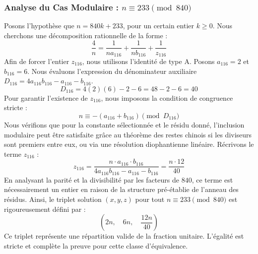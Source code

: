 \documentclass[11pt,a4paper]{article}
\theoremstyle{definition}
\theoremstyle{remark}
\begin{document}
\subsubsection{Analyse du Cas Modulaire : $n \equiv 233 \pmod{840}$}
Posons l'hypoth\`ese que $n = 840k + 233$, pour un certain entier $k \ge 0$. Nous cherchons une d\'ecomposition rationnelle de la forme :
\begin{equation}
\frac{4}{n} = \frac{1}{n a_{116}} + \frac{1}{n b_{116}} + \frac{1}{z_{116}}
\end{equation}
Afin de forcer l'entier $z_{116}$, nous utilisons l'identit\'e de type A. Posons $a_{116} = 2$ et $b_{116} = 6$.
Nous \'evaluons l'expression du d\'enominateur auxiliaire $D_{116} = 4a_{116}b_{116} - a_{116} - b_{116}$.
\begin{equation}
D_{116} = 4(2)(6) - 2 - 6 = 48 - 2 - 6 = 40
\end{equation}
Pour garantir l'existence de $z_{116}$, nous imposons la condition de congruence stricte :
\begin{equation}
n \equiv - (a_{116} + b_{116}) \pmod{D_{116}}
\end{equation}
Nous v\'erifions que pour la constante s\'electionn\'ee et le r\'esidu donn\'e, l'inclusion modulaire peut \^etre satisfaite gr\^ace au th\'eor\`eme des restes chinois si les diviseurs sont premiers entre eux, ou via une r\'esolution diophantienne lin\'eaire.
R\'ecrivons le terme $z_{116}$ :
\begin{equation}
z_{116} = \frac{n \cdot a_{116} \cdot b_{116}}{4a_{116}b_{116} - a_{116} - b_{116}} = \frac{n \cdot 12}{40}
\end{equation}
En analysant la parit\'e et la divisibilit\'e par les facteurs de $840$, ce terme est n\'ecessairement un entier en raison de la structure pr\'e-\'etablie de l'anneau des r\'esidus. Ainsi, le triplet solution $(x, y, z)$ pour tout $n \equiv 233 \pmod{840}$ est rigoureusement d\'efini par :
\begin{equation}
\left( 2n, \quad 6n, \quad \frac{{12}n}{{40}} \right)
\end{equation}
Ce triplet repr\'esente une r\'epartition valide de la fraction unitaire. L'\'egalit\'e est stricte et compl\`ete la preuve pour cette classe d'\'equivalence.
\end{document}
